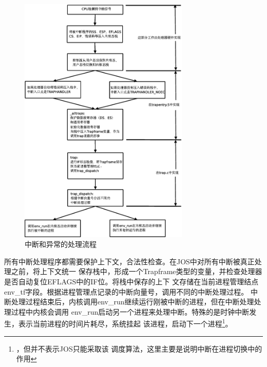 \documentclass[12pt,openany,a4paper]{report}
\begin{document}
	\begin{figure}[htb]
		\centering
		\includegraphics[height=12cm]{interrupt.eps}
		\caption[中断和异常的处理流程]{中断和异常的处理流程}
	\end{figure}

	    所有中断处理程序都需要保护上下文，合法性检查。在JOS中对所有中断被真正处理之前，将上下文统一
	保存栈中，形成一个Trapframe类型的变量，并检查处理器是否自动复位EFLAGS中的IF位。将栈中保存的上下
	文存储在当前进程管理结点env\_tf字段。根据进程管理点记录的中断向量号，调用不同的中断处理过程。
	中断处理过程结束后，内核调用env\_run继续运行刚被中断的进程，但在中断处理处理过程中内核会调用
	env\_run启动另一个进程来处理中断。特殊的是时钟中断发生，表示当前进程的时间片耗尽，系统挂起
	该进程，启动下一个进程\footnote{，但并不表示JOS只能采取该
	调度算法，这里主要是说明中断在进程切换中的作用}。\par  
\end{document}
